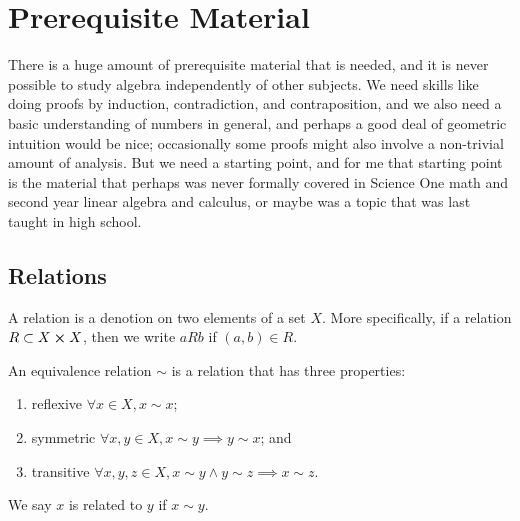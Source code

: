 \chapter{Prerequisite Material}

\begin{remark}
    There is a huge amount of prerequisite material that is needed,
    and it is never possible to study algebra independently of other subjects.
    We need skills like doing proofs
    by induction, contradiction, and contraposition,
    and we also need a basic understanding of numbers in general,
    and perhaps a good deal of geometric intuition would be nice;
    occasionally some proofs might also involve a non-trivial amount of analysis.
    But we need a starting point,
    and for me that starting point
    is the material that perhaps was never formally covered in Science One math
    and second year linear algebra and calculus,
    or maybe was a topic that was last taught in high school.
\end{remark}


\section{Relations}

\begin{definition}
    A relation is a denotion on two elements of a set \(X\).
    More specifically,
    if a relation \(R \subset X \cross X\),
    then we write \(aRb\) if \((a,b) \in R\).
\end{definition}

\begin{definition}
    An equivalence relation \(\sim\)
    is a relation that has three properties:
    \begin{enumerate}[label={(\roman*)}, itemsep=0mm]
        \item reflexive \(\forall x \in X, x \sim x\);
        \item symmetric \(\forall x,y \in X, x \sim y \implies y \sim x\); and
        \item transitive \(\forall x,y,z \in X,
            x \sim y \land y \sim z \implies x \sim z\).
    \end{enumerate}
    We say \(x\) is related to \(y\) if \(x \sim y\).
\end{definition}

